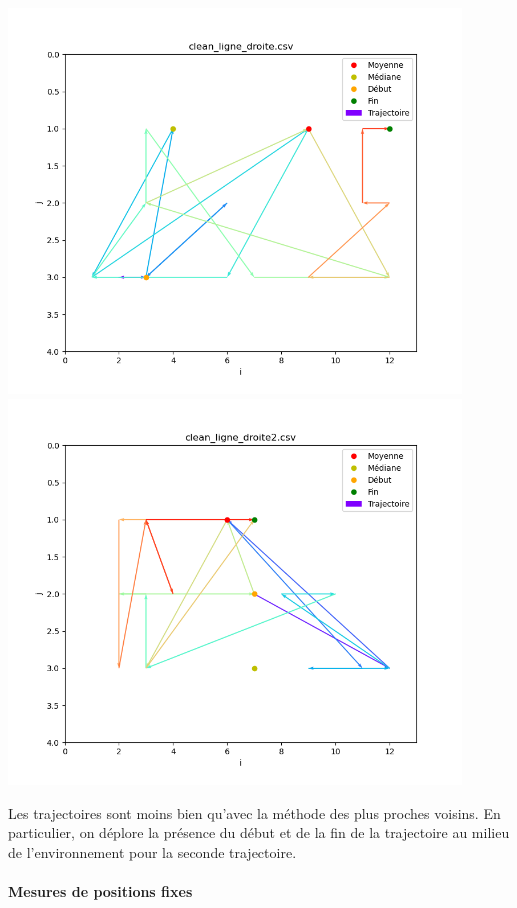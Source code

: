 \documentclass[french, a4paper, 12pt, parskip]{scrartcl}
\begin{document}
\begin{center}
  \includegraphics[width=0.9\textwidth]{finger3-l1.png}
  \includegraphics[width=0.9\textwidth]{finger3-l2.png}
\end{center}
Les trajectoires sont moins bien qu'avec la méthode des plus proches voisins.
En particulier, on déplore la présence du début et de la fin de la trajectoire
au milieu de l'environnement pour la seconde trajectoire.

\paragraph{Mesures de positions fixes}
\end{document}
